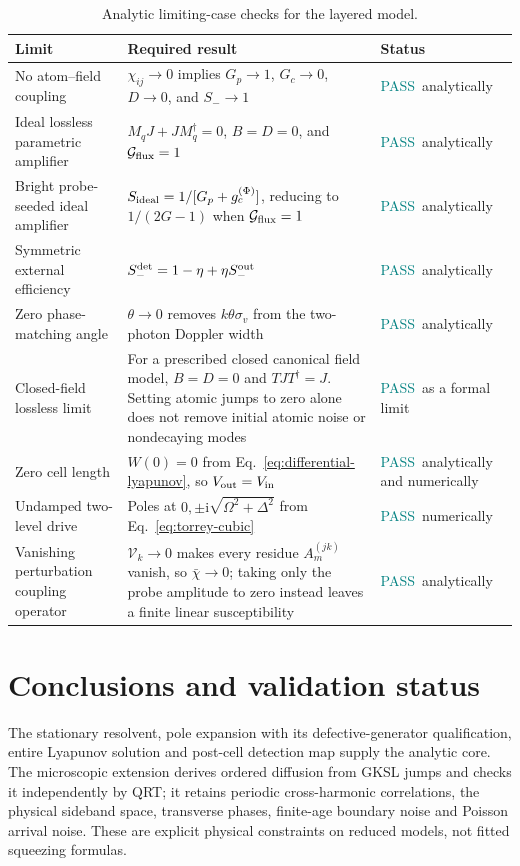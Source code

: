 \documentclass[11pt,a4paper]{article}
\newcommand{\ii}{\mathrm i}
\newcommand{\chibar}{\bar\chi}
\newcommand{\pass}{\textcolor{teal}{PASS}}
\begin{document}
\begin{table}[!ht]
\centering
\caption{Analytic limiting-case checks for the layered model.}
\label{tab:limits}
\small
\begin{tabularx}{\textwidth}{L{3.5cm}Y L{2.2cm}}
\toprule
Limit & Required result & Status\\
\midrule
No atom--field coupling &
$\chi_{ij}\to0$ implies $G_p\to1$, $G_c\to0$, $D\to0$, and $S_-\to1$ &
\pass\ analytically\\
Ideal lossless parametric amplifier &
$M_qJ+JM_q^\dagger=0$, $B=D=0$, and $\mathcal G_{\rm flux}=1$ &
\pass\ analytically\\
Bright probe-seeded ideal amplifier &
$S_{\rm ideal}=1/[G_p+g_c^{(\Phi)}]$, reducing to $1/(2G-1)$ when
$\mathcal G_{\rm flux}=1$ &
\pass\ analytically\\
Symmetric external efficiency &
$S_-^{\rm det}=1-\eta+\eta S_-^{\rm out}$ &
\pass\ analytically\\
Zero phase-matching angle &
$\theta\to0$ removes $k\theta\sigma_v$ from the two-photon Doppler width &
\pass\ analytically\\
Closed-field lossless limit &
For a prescribed closed canonical field model, $B=D=0$ and $TJT^\dagger=J$. Setting atomic jumps to zero alone does not remove initial atomic noise or nondecaying modes &
\pass\ as a formal limit\\
Zero cell length &
$W(0)=0$ from Eq.~\eqref{eq:differential-lyapunov}, so
$V_{\rm out}=V_{\rm in}$ &
\pass\ analytically and numerically\\
Undamped two-level drive &
Poles at $0,\pm\ii\sqrt{\Omega^2+\Delta^2}$ from
Eq.~\eqref{eq:torrey-cubic} & \pass\ numerically\\
Vanishing perturbation coupling operator &
$\mathcal V_k\to0$ makes every residue $A_m^{(jk)}$ vanish, so
$\chibar\to0$; taking only the probe amplitude to zero instead leaves a finite linear susceptibility & \pass\ analytically\\
\bottomrule
\end{tabularx}
\end{table}

\clearpage
\section{Conclusions and validation status}
The stationary resolvent, pole expansion with its defective-generator
qualification, entire Lyapunov solution and post-cell detection map supply
the analytic core. The microscopic extension derives ordered diffusion from
GKSL jumps and checks it independently by QRT; it retains periodic
cross-harmonic correlations, the physical sideband space, transverse phases,
finite-age boundary noise and Poisson arrival noise. These are explicit
physical constraints on reduced models, not fitted squeezing formulas.
\end{document}
